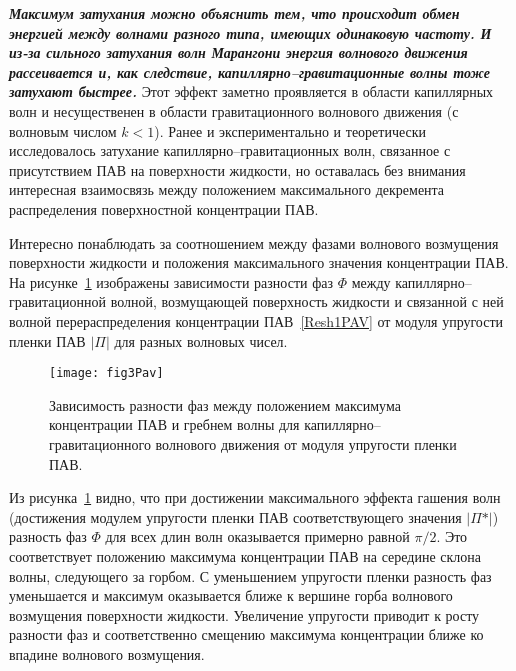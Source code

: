 \textit{
\textbf{Максимум затухания можно объяснить тем, что происходит обмен энергией между волнами разного типа, имеющих одинаковую частоту. И из-за сильного затухания волн Марангони энергия волнового движения рассеивается и, как следствие, капиллярно--гравитационные волны тоже затухают быстрее.}} Этот эффект заметно проявляется в области капиллярных волн и несущественен в области гравитационного волнового движения (с волновым числом $ k<1 $). Ранее и экспериментально и теоретически исследовалось затухание капиллярно--гравитационных волн, связанное с присутствием ПАВ на поверхности жидкости, но оставалась без внимания интересная взаимосвязь между положением максимального декремента  распределения поверхностной концентрации ПАВ.

Интересно понаблюдать за соотношением между фазами волнового возмущения поверхности жидкости и положения максимального значения концентрации ПАВ. На рисунке~\ref{fig:Fig3PAV} изображены зависимости 	разности фаз $ \Phi $ между капиллярно--гравитационной волной, возмущающей поверхность жидкости и связанной с ней волной перераспределения концентрации ПАВ~\eqref{Resh1PAV} от модуля упругости пленки ПАВ $ \vert \Pi \vert $ для разных волновых чисел. 
\begin{figure}[ht]
\centering
\texttt{[image: fig3Pav]}
\caption{Зависимость разности фаз между положением максимума концентрации ПАВ и гребнем волны для капиллярно--гравитационного волнового движения от модуля упругости пленки ПАВ.}\label{fig:Fig3PAV}
\end{figure} 	
Из рисунка~\ref{fig:Fig3PAV} видно, что при достижении максимального эффекта гашения волн (достижения модулем упругости пленки ПАВ соответствующего значения $ \vert \Pi* \vert $) разность фаз $ \Phi $ для всех длин волн оказывается примерно равной $ \pi/2 $. Это соответствует положению максимума концентрации ПАВ на середине склона волны, следующего за горбом. С уменьшением упругости пленки разность фаз уменьшается и максимум оказывается ближе к вершине горба волнового возмущения поверхности жидкости. Увеличение упругости приводит к росту разности фаз и соответственно смещению максимума концентрации ближе ко впадине волнового возмущения.
	
